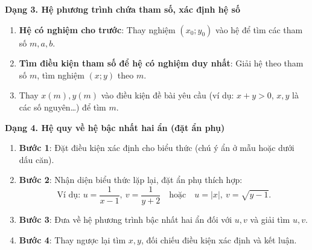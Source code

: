 \textbf{Dạng 3. Hệ phương trình chứa tham số, xác định hệ số}
\begin{enumerate}
\item \textbf{Hệ có nghiệm cho trước}: Thay nghiệm $(x_0; y_0)$ vào hệ để tìm các tham số $m, a, b$.
\item \textbf{Tìm điều kiện tham số để hệ có nghiệm duy nhất}: Giải hệ theo tham số $m$, tìm nghiệm $(x; y)$ theo $m$.
\item Thay $x(m), y(m)$ vào điều kiện đề bài yêu cầu (ví dụ: $x + y > 0$, $x, y$ là các số nguyên\dots) để tìm $m$.
\end{enumerate}

\textbf{Dạng 4. Hệ quy về hệ bậc nhất hai ẩn (đặt ẩn phụ)}
\begin{enumerate}
\item \textbf{Bước 1}: Đặt điều kiện xác định cho biểu thức (chú ý ẩn ở mẫu hoặc dưới dấu căn).
\item \textbf{Bước 2}: Nhận diện biểu thức lặp lại, đặt ẩn phụ thích hợp:
$$\text{Ví dụ: } u = \dfrac{1}{x-1},\ v = \dfrac{1}{y+2}\quad \text{hoặc}\quad u = |x|,\ v = \sqrt{y-1}.$$
\item \textbf{Bước 3}: Đưa về hệ phương trình bậc nhất hai ẩn đối với $u, v$ và giải tìm $u, v$.
\item \textbf{Bước 4}: Thay ngược lại tìm $x, y$, đối chiếu điều kiện xác định và kết luận.
\end{enumerate}
